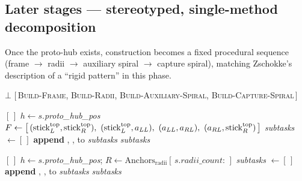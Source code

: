 \subsection{Later stages --- stereotyped, single-method decomposition}
\label{sec:orig-later}

Once the proto-hub exists, construction becomes a fixed procedural sequence (frame $\to$ radii $\to$ auxiliary spiral $\to$ capture spiral), matching Zschokke's description of a ``rigid pattern'' in this phase.

\begin{algorithm}[H]
\caption{Method for \textsc{Build-Remaining-Web}}
\label{alg:orig-remaining}
\begin{algorithmic}[1]
    \State \Return $\bot$
  \EndIf
  \State \Return $[\,$\textsc{Build-Frame}, \textsc{Build-Radii}, \textsc{Build-Auxiliary-Spiral},\newline
    \hspace*{\algorithmicindent}\phantom{\textbf{return} $[\,$}\textsc{Build-Capture-Spiral}$\,]$
\EndFunction
\end{algorithmic}
\end{algorithm}

\begin{algorithm}[H]
\caption{Method for \textsc{Build-Frame} --- top frame first, then left, bottom, right}
\label{alg:orig-frame}
\begin{algorithmic}[1]
    \State \Return $[\,]$
  \EndIf
  \State $h \gets s.$\textit{proto\_hub\_pos}
  \State $F \gets \bigl[\,(\origstick{L}{top}, \origstick{R}{top}),\ (\origstick{L}{top}, a_{LL}),\ (a_{LL}, a_{RL}),\ (a_{RL}, \origstick{R}{top})\,\bigr]$ 
  \State \textit{subtasks} $\gets [\,]$
    \State \textbf{append} , ,  to \textit{subtasks}
  \EndFor
  \State \Return \textit{subtasks}
\EndFunction
\end{algorithmic}
\end{algorithm}

\begin{algorithm}[H]
\caption{Method for \textsc{Build-Radii} --- circle hub, fill gaps until 8 radii placed}
\label{alg:orig-radii}
\begin{algorithmic}[1]
    \State \Return $[\,]$
  \EndIf
  \State $h \gets s.$\textit{proto\_hub\_pos}; \quad $R \gets \mathrm{Anchors}_{\mathrm{radii}}[\,s.\textit{radii\_count}:\,]$
  \State \textit{subtasks} $\gets [\,]$
    \State \textbf{append} , ,  to \textit{subtasks} 
  \EndFor
  \State \Return \textit{subtasks}
\EndFunction
\end{algorithmic}
\end{algorithm}

